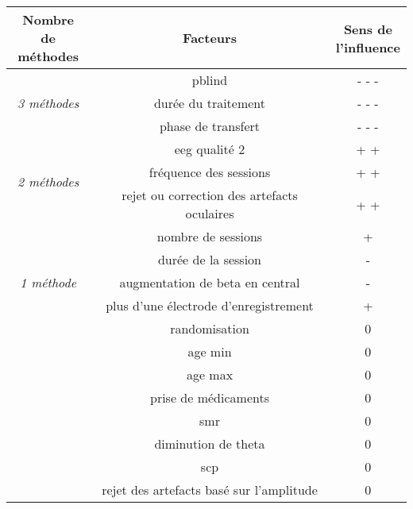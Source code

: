 \begin{center}
\small 
\begin{tabular}{ ccc }
\toprule
\shortstack{Nombre de \\ méthodes}  & Facteurs & \shortstack{ Sens de \\ l'influence } \\
\midrule
\multirow{ 3}{*}{ \textit{3 méthodes} } & \gls{pblind} & - - - \\ 
& durée du traitement & - - - \\  
& phase de transfert & - - - \\  
\midrule
\multirow{ 3}{*}{ \textit{2 méthodes} } & \gls{eeg} qualité 2 & + + \\
& fréquence des sessions & + + \\
& rejet ou correction des artefacts oculaires & + + \\
\midrule
\multirow{ 5}{*}{ \textit{1 méthode} } & nombre de sessions & + \\
& durée de la session & - \\
& augmentation de beta en central & - \\
& plus d'une électrode d'enregistrement & + \\
\midrule
\multirow{ 8}{*}{ \textit{ Aucune méthode } } & randomisation & 0 \\ 
& age min & 0 \\ 
& age max & 0\\  
& prise de médicaments & 0 \\
& \gls{smr} & 0 \\
& diminution de theta & 0 \\
& \gls{scp} & 0 \\
& rejet des artefacts basé sur l'amplitude & 0 \\
\bottomrule
\end{tabular}
\end{center}